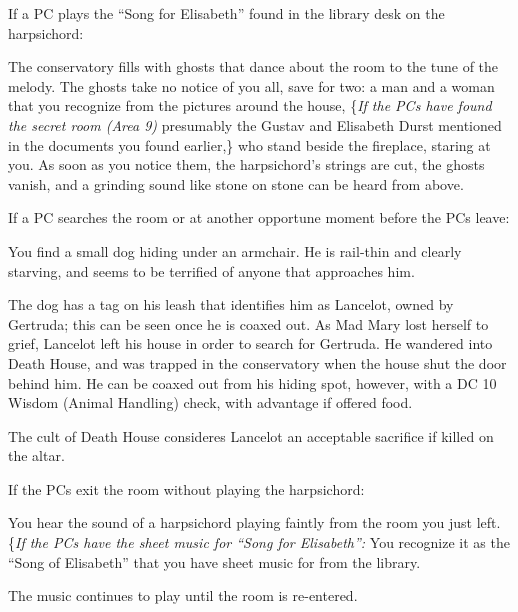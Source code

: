 If a PC plays the ``Song for Elisabeth'' found in the library desk on the harpsichord:
\begin{readout}
  The conservatory fills with ghosts that dance about the room to the tune of the melody. The ghosts take no
  notice of you all, save for two: a man and a woman that you recognize from the pictures around the house,
  \{\textit{If the PCs have found the secret room (Area 9)} presumably the Gustav and Elisabeth Durst mentioned
  in the documents you found earlier,\} who stand beside the fireplace, staring at you. As soon as you notice
  them, the harpsichord's strings are cut, the ghosts vanish, and a grinding sound like stone on stone can be
  heard from above.
\end{readout}

If a PC searches the room or at another opportune moment before the PCs leave:
\begin{readout}
  You find a small dog hiding under an armchair. He is rail-thin and clearly starving, and seems to be
  terrified of anyone that approaches him. 
\end{readout}
The dog has a tag on his leash that identifies him as Lancelot, owned by Gertruda; this can be seen once he is
coaxed out. As Mad Mary lost herself to grief, Lancelot left his house in order to search for Gertruda. He
wandered into Death House, and was trapped in the conservatory when the house shut the door behind him. He
can be coaxed out from his hiding spot, however, with a DC 10 Wisdom (Animal Handling) check, with advantage
if offered food.

The cult of Death House consideres Lancelot an acceptable sacrifice if killed on the altar.

If the PCs exit the room without playing the harpsichord:
\begin{readout}
  You hear the sound of a harpsichord playing faintly from the room you just left.
  \{\textit{If the PCs have the sheet music for ``Song for Elisabeth'':} You recognize it as the
  ``Song of Elisabeth'' that you have sheet music for from the library.
\end{readout}
The music continues to play until the room is re-entered.

\begin{arealinks}
\end{arealinks}
